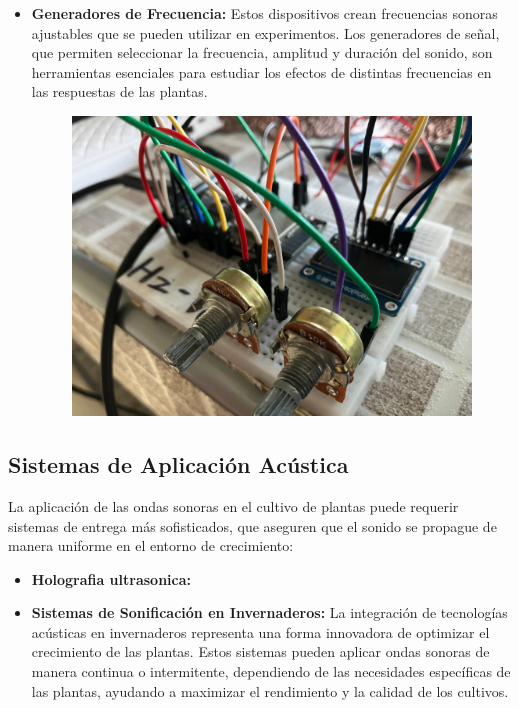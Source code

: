 \documentclass[twocolumn]{article}
\begin{document}
\begin{itemize}
\begin{figure}[!h]
    \end{figure}
    \item \textbf{Generadores de Frecuencia:} Estos dispositivos crean frecuencias sonoras ajustables que se pueden utilizar en experimentos. Los generadores de señal, que permiten seleccionar la frecuencia, amplitud y duración del sonido, son herramientas esenciales para estudiar los efectos de distintas frecuencias en las respuestas de las plantas.
    \begin{figure}[!h]
        \centering
        \includegraphics[width=\linewidth]{imagenes/50bf0c18-4558-440c-be7b-23011baf005c.jpeg}       
    \end{figure}
\end{itemize}

\subsection{Sistemas de Aplicación Acústica}

La aplicación de las ondas sonoras en el cultivo de plantas puede requerir sistemas de entrega más sofisticados, que aseguren que el sonido se propague de manera uniforme en el entorno de crecimiento:

\begin{itemize}
    \item \textbf{Holografia ultrasonica:}
    
    \item \textbf{Sistemas de Sonificación en Invernaderos:} La integración de tecnologías acústicas en invernaderos representa una forma innovadora de optimizar el crecimiento de las plantas. Estos sistemas pueden aplicar ondas sonoras de manera continua o intermitente, dependiendo de las necesidades específicas de las plantas, ayudando a maximizar el rendimiento y la calidad de los cultivos.
\end{itemize}
\end{document}
